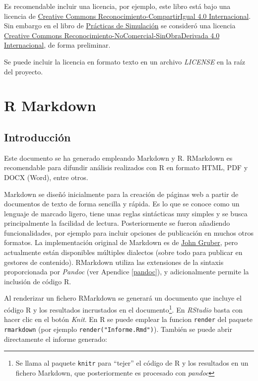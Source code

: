 \documentclass[]{book}
\let\rmarkdownfootnote\footnote%
\def\footnote{\protect\rmarkdownfootnote}
\theoremstyle{definition}
\theoremstyle{definition}
\theoremstyle{definition}
\theoremstyle{remark}
\begin{document}
Es recomendable incluir una licencia, por ejemplo, este libro está bajo
una licencia de
\href{https://creativecommons.org/licenses/by-sa/4.0/deed.es}{Creative
Commons Reconocimiento-CompartirIgual 4.0 Internacional}. Sin embargo en
el libro de \href{https://rubenfcasal.github.io/simbook}{Prácticas de
Simulación} se consideró una licencia
\href{https://creativecommons.org/licenses/by-nc-nd/4.0/deed.es_ES}{Creative
Commons Reconocimiento-NoComercial-SinObraDerivada 4.0 Internacional},
de forma preliminar.

Se puede incluir la licencia en formato texto en un archivo
\emph{LICENSE} en la raíz del proyecto.

\appendix


\chapter{R Markdown}\label{rmarkdown}

\section{Introducción}\label{introduccion-1}

Este documento se ha generado empleando Markdown y R. RMarkdown es
recomendable para difundir análisis realizados con R en formato HTML,
PDF y DOCX (Word), entre otros.

Markdown se diseñó inicialmente para la creación de páginas web a partir
de documentos de texto de forma sencilla y rápida. Es lo que se conoce
como un lenguaje de marcado ligero, tiene unas reglas sintácticas muy
simples y se busca principalmente la facilidad de lectura.
Posteriormente se fueron añadiendo funcionalidades, por ejemplo para
incluir opciones de publicación en muchos otros formatos. La
implementación original de Markdown es de
\href{http://daringfireball.net/projects/markdown/}{John Gruber}, pero
actualmente están disponibles múltiples dialectos (sobre todo para
publicar en gestores de contenido). RMarkdown utiliza las extensiones de
la sintaxis proporcionada por \emph{Pandoc} (ver Apendice \ref{pandoc}),
y adicionalmente permite la inclusión de código R.

Al renderizar un fichero RMarkdown se generará un documento que incluye
el código R y los resultados incrustados en el documento\footnote{Se
  llama al paquete \texttt{knitr} para ``tejer'' el código de R y los
  resultados en un fichero Markdown, que posteriormente es procesado con
  \emph{pandoc}}. En \emph{RStudio} basta con hacer clic en el botón
\emph{Knit}. En R se puede emplear la funcion \texttt{render} del
paquete \texttt{rmarkdown} (por ejemplo \texttt{render("Informe.Rmd")}).
También se puede abrir directamente el informe generado:
\end{document}
